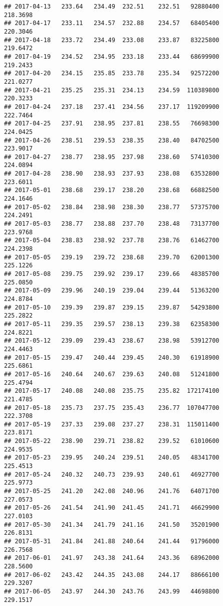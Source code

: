 \documentclass[
]{article}
\begin{document}
\begin{verbatim}
## 2017-04-13   233.64   234.49  232.51    232.51   92880400     218.3698
## 2017-04-17   233.11   234.57  232.88    234.57   68405400     220.3046
## 2017-04-18   233.72   234.49  233.08    233.87   83225800     219.6472
## 2017-04-19   234.52   234.95  233.18    233.44   68699900     219.2433
## 2017-04-20   234.15   235.85  233.78    235.34   92572200     221.0277
## 2017-04-21   235.25   235.31  234.13    234.59  110389800     220.3233
## 2017-04-24   237.18   237.41  234.56    237.17  119209900     222.7464
## 2017-04-25   237.91   238.95  237.81    238.55   76698300     224.0425
## 2017-04-26   238.51   239.53  238.35    238.40   84702500     223.9017
## 2017-04-27   238.77   238.95  237.98    238.60   57410300     224.0894
## 2017-04-28   238.90   238.93  237.93    238.08   63532800     223.6011
## 2017-05-01   238.68   239.17  238.20    238.68   66882500     224.1646
## 2017-05-02   238.84   238.98  238.30    238.77   57375700     224.2491
## 2017-05-03   238.77   238.88  237.70    238.48   73137700     223.9768
## 2017-05-04   238.83   238.92  237.78    238.76   61462700     224.2398
## 2017-05-05   239.19   239.72  238.68    239.70   62001300     225.1226
## 2017-05-08   239.75   239.92  239.17    239.66   48385700     225.0850
## 2017-05-09   239.96   240.19  239.04    239.44   51363200     224.8784
## 2017-05-10   239.39   239.87  239.15    239.87   54293800     225.2822
## 2017-05-11   239.35   239.57  238.13    239.38   62358300     224.8221
## 2017-05-12   239.09   239.43  238.67    238.98   53912700     224.4463
## 2017-05-15   239.47   240.44  239.45    240.30   61918900     225.6861
## 2017-05-16   240.64   240.67  239.63    240.08   51241800     225.4794
## 2017-05-17   240.08   240.08  235.75    235.82  172174100     221.4785
## 2017-05-18   235.73   237.75  235.43    236.77  107047700     222.3708
## 2017-05-19   237.33   239.08  237.27    238.31  115011400     223.8171
## 2017-05-22   238.90   239.71  238.82    239.52   61010600     224.9535
## 2017-05-23   239.95   240.24  239.51    240.05   48341700     225.4513
## 2017-05-24   240.32   240.73  239.93    240.61   46927700     225.9773
## 2017-05-25   241.20   242.08  240.96    241.76   64071700     227.0573
## 2017-05-26   241.54   241.90  241.45    241.71   46629900     227.0103
## 2017-05-30   241.34   241.79  241.16    241.50   35201900     226.8131
## 2017-05-31   241.84   241.88  240.64    241.44   91796000     226.7568
## 2017-06-01   241.97   243.38  241.64    243.36   68962000     228.5600
## 2017-06-02   243.42   244.35  243.08    244.17   88666100     229.3207
## 2017-06-05   243.97   244.30  243.76    243.99   44698800     229.1517

\end{verbatim}
\end{document}
